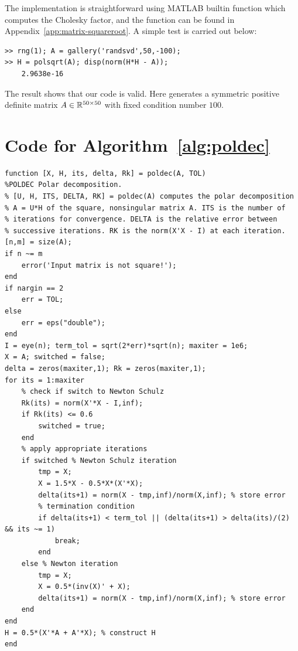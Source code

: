 \documentclass[12pt]{article}
\begin{document}
The implementation is straightforward using MATLAB builtin function  which computes the Cholesky factor, and the function  can be found in Appendix~\ref{app:matrix-squareroot}. A simple test is carried out below:
\begin{lstlisting}
>> rng(1); A = gallery('randsvd',50,-100); 
>> H = polsqrt(A); disp(norm(H*H - A));
    2.9638e-16
\end{lstlisting}
The result shows that our code is valid. Here  generates a symmetric positive definite matrix $A\in\mathbb{R}^{50\times 50}$ with fixed condition number $100$.




\newpage 


\newpage 
\appendix
\section{Code for Algorithm~\ref{alg:poldec}} \label{app:poldec.m}
\begin{lstlisting}
function [X, H, its, delta, Rk] = poldec(A, TOL)
%POLDEC Polar decomposition.
% [U, H, ITS, DELTA, RK] = poldec(A) computes the polar decomposition 
% A = U*H of the square, nonsingular matrix A. ITS is the number of
% iterations for convergence. DELTA is the relative error between 
% successive iterations. RK is the norm(X'X - I) at each iteration.
[n,m] = size(A);
if n ~= m
    error('Input matrix is not square!');
end
if nargin == 2
    err = TOL;
else
    err = eps("double");
end
I = eye(n); term_tol = sqrt(2*err)*sqrt(n); maxiter = 1e6;
X = A; switched = false; 
delta = zeros(maxiter,1); Rk = zeros(maxiter,1);
for its = 1:maxiter
    % check if switch to Newton Schulz
    Rk(its) = norm(X'*X - I,inf);
    if Rk(its) <= 0.6
        switched = true;
    end
    % apply appropriate iterations
    if switched % Newton Schulz iteration
        tmp = X;
        X = 1.5*X - 0.5*X*(X'*X);
        delta(its+1) = norm(X - tmp,inf)/norm(X,inf); % store error
        % termination condition
        if delta(its+1) < term_tol || (delta(its+1) > delta(its)/(2) && its ~= 1)
            break;
        end
    else % Newton iteration
        tmp = X;
        X = 0.5*(inv(X)' + X);
        delta(its+1) = norm(X - tmp,inf)/norm(X,inf); % store error
    end
end
H = 0.5*(X'*A + A'*X); % construct H
end
\end{lstlisting}
\newpage 
\end{document}
